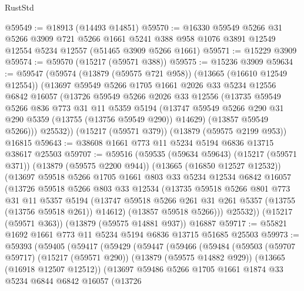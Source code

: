 \begin{lexlean}{RustStd}
\begin{coremodule}
@59549 := @18913 (@14493 @14851)
@59570 := @16330
    @59549
    @5266
    @31
    @5266
    @3909
    @721
    @5266
    @1661
    @5241
    @388
    @958
    @1076
    @3891
    @12549
    @12554
    @5234
    @12557
    (@51465 @3909 @5266 @1661)
@59571 := @15229 @3909
@59574 := @59570 (@15217 (@59571 @388))
@59575 := @15236 @3909
@59634 := @59547
    (@59574
      (@13879 (@59575 @721 @958))
      (@13665 (@16610 @12549 @12554))
      (@13697
        @59549
        @5266
        @1705
        @1661
        @2026
        @33
        @5234
        @12556
        @6842
        @16057
        (@13726
          @59549
          @5266
          @2026
          @33
          @12556
          (@13735
            @59549
            @5266
            @836
            @773
            @31
            @11
            @5359
            @5194
            (@13747 @59549 @5266 @290 @31 @290 @5359 (@13755 (@13756 @59549 @290)) @14629)
            (@13857 @59549 @5266)))
        @25532))
    (@15217 (@59571 @379))
    (@13879 (@59575 @2199 @953))
    @16815
@59643 := @38608 @1661 @773 @11 @5234 @5194 @6836 @13715 @38617 @25503
@59707 := @59516
    (@59535
      (@59634 @59643)
      (@15217 (@59571 @371))
      (@13879 (@59575 @2200 @944))
      (@13665 (@16850 @12527 @12532))
      (@13697
        @59518
        @5266
        @1705
        @1661
        @803
        @33
        @5234
        @12534
        @6842
        @16057
        (@13726
          @59518
          @5266
          @803
          @33
          @12534
          (@13735
            @59518
            @5266
            @801
            @773
            @31
            @11
            @5357
            @5194
            (@13747 @59518 @5266 @261 @31 @261 @5357 (@13755 (@13756 @59518 @261)) @14612)
            (@13857 @59518 @5266)))
        @25532))
    (@15217 (@59571 @363))
    (@13879 (@59575 @14881 @937))
    @16887
@59717 := @55821 @1692 @1661 @773 @11 @5234 @5194 @6836 @13715 @51685 @25503
@59973 := @59393
    (@59405
      (@59417
        (@59429
          (@59447
            (@59466
              (@59484
                (@59503
                  (@59707 @59717)
                  (@15217 (@59571 @290))
                  (@13879 (@59575 @14882 @929))
                  (@13665 (@16918 @12507 @12512))
                  (@13697
                    @59486
                    @5266
                    @1705
                    @1661
                    @1874
                    @33
                    @5234
                    @6844
                    @6842
                    @16057
                    (@13726

\end{coremodule}
\end{lexlean}
